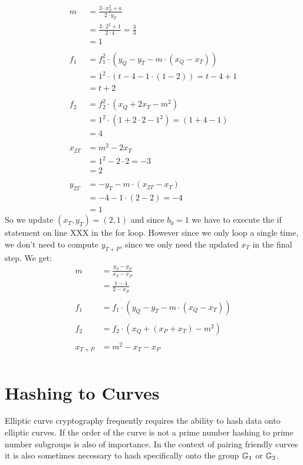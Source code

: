 \begin{example}
\begin{align*}
m & = \frac{3\cdot x_T^2 +a}{2\cdot y_T}\\
  & = \frac{3\cdot 2^2 +1}{2\cdot 4}
    = \frac{3}{3}\\
  & = 1\\
  \\
f_1 & = f_1^2\cdot (y_Q - y_T - m\cdot(x_Q-x_T)) \\
    & = 1^2\cdot (t - 4 - 1\cdot(1-2))
      = t-4+1\\
    & = t+2\\
    \\
f_2 & =  f_2^2\cdot (x_Q + 2x_T -m^2)\\
    & = 1^2\cdot (1 + 2\cdot 2 -1^2)
      = (1 + 4 -1)\\
    & = 4\\
\\  
x_{2T} & =  m^2 - 2 x_T\\
       & =  1^2 - 2\cdot 2
         = -3\\
       & = 2 \\  
\\
y_{2T} & = -y_T - m\cdot (x_{2T}-x_T)\\
       & = -4 - 1\cdot (2-2)
         = -4\\
       & = 1
\end{align*}
So we update $(x_T,y_T) =(2,1)$ and since $b_0=1$ we have to execute the if statement on line XXX in the for loop. However since we only loop a single time, we don't need to compute $y_{T+P}$, since we only need the updated $x_T$ in the final step. We get:
\begin{align*}
m & =  \frac{y_T -y_P}{x_T - x_P}\\
  & =  \frac{1 -4}{2 - x_P}\\
\\
f_1 & = f_1\cdot (y_Q -y_T -m\cdot (x_Q - x_T))\\
\\
f_2 & = f_2\cdot (x_Q + (x_P+x_T) - m^2)\\
\\
x_{T+P} & = m^2 -x_T -x_P\\
\end{align*}
\end{example}


\section{Hashing to Curves} Elliptic curve cryptography frequently requires the ability to hash data onto elliptic curves. If the order of the curve is not a prime number hashing to prime number subgroups is also of importance. In the context of pairing friendly curves it is also sometimes necessary to hash specifically onto the group $\mathbb{G}_1$ or $\mathbb{G}_2$.

